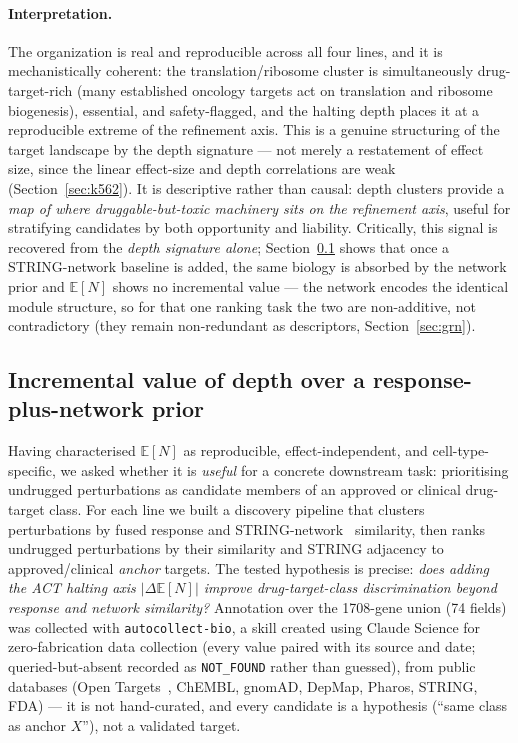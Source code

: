 \documentclass[11pt]{article}
\newcommand{\EN}{\ensuremath{\mathbb{E}[N]}}
\begin{document}
\paragraph{Interpretation.} The organization is real and reproducible across all four lines, and it
is mechanistically coherent: the translation/ribosome cluster is simultaneously drug-target-rich
(many established oncology targets act on translation and ribosome biogenesis), essential, and
safety-flagged, and the halting depth places it at a reproducible extreme of the refinement axis.
This is a genuine structuring of the target landscape by the depth signature --- not merely a
restatement of effect size, since the linear effect-size and depth correlations are weak
(Section~\ref{sec:k562}). It is descriptive rather than causal: depth clusters provide a \emph{map
of where druggable-but-toxic machinery sits on the refinement axis}, useful for stratifying
candidates by both opportunity and liability. Critically, this signal is recovered from the
\emph{depth signature alone}; Section~\ref{sec:drug} shows that once a STRING-network baseline is
added, the same biology is absorbed by the network prior and \EN{} shows no incremental value ---
the network encodes the identical module structure, so for that one ranking task the two are
non-additive, not contradictory (they remain non-redundant as descriptors, Section~\ref{sec:grn}).

\FloatBarrier
\subsection{Incremental value of depth over a response-plus-network prior}
\label{sec:drug}

Having characterised \EN{} as reproducible, effect-independent, and cell-type-specific, we asked
whether it is \emph{useful} for a concrete downstream task: prioritising undrugged perturbations
as candidate members of an approved or clinical drug-target class. For each line we built a
discovery pipeline that clusters perturbations by fused response and STRING-network~\cite{string2023} similarity,
then ranks undrugged perturbations by their similarity and STRING adjacency to approved/clinical
\emph{anchor} targets. The tested hypothesis is precise: \emph{does adding the ACT halting axis
$|\Delta\EN{}|$ improve drug-target-class discrimination beyond response and network similarity?}
Annotation over the 1708-gene union (74 fields) was collected with \texttt{autocollect-bio}, a
skill created using Claude Science for zero-fabrication data collection (every value paired with its source and
date; queried-but-absent recorded as \texttt{NOT\_FOUND} rather than guessed), from public databases
(Open Targets~\cite{opentargets2023}, ChEMBL, gnomAD, DepMap, Pharos, STRING, FDA) --- it is
not hand-curated, and every candidate is a hypothesis (``same class as anchor $X$''), not a
validated target.
\end{document}
